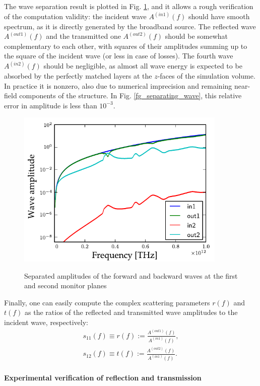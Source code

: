The wave separation result is plotted in Fig. \ref{fg_ampli}, and it allows a rough verification of the computation validity: the incident wave $A^{(in 1)}(f)$ should have smooth spectrum, as it is directly generated by the broadband source. The reflected wave $A^{(out 1)}(f)$ and the transmitted one $A^{(out 2)}(f)$ should be somewhat complementary to each other, with squares of their amplitudes summing up to the square of the incident wave (or less in case of losses). The fourth wave $A^{(in 2)}(f)$ should be negligible, as almost all wave energy is expected to be absorbed by the perfectly matched layers at the $z$-faces of the simulation volume. In practice it is nonzero, also due to numerical imprecision and remaining near-field components of the structure. In Fig. \ref{fg_separating_wave}, this relative error in amplitude is less than $10^{-3}$.
\begin{figure}[ht] \caption{Separated amplitudes of the forward and backward waves at the first and second monitor planes}  \centering \includegraphics[width=10cm]{img/sim_ampli_debug_band.pdf}\label{fg_ampli} \end{figure} 

Finally, one can easily compute the complex scattering parameters $r(f)$ and $t(f)$ as the ratios of the reflected and transmitted wave amplitudes to the incident wave, respectively:
\begin{equation} 
	\begin{split}
		s_{11}(f) \equiv r(f) := \frac{A^{(out 1)}(f)}{A^{(in 1)}(f)},\\
		s_{12}(f) \equiv t(f) := \frac{A^{(out 2)}(f)}{A^{(in 1)}(f)}.
	\end{split}
\label{eq_sparam}\end{equation}
\paragraph{Experimental verification of reflection and transmission} %

